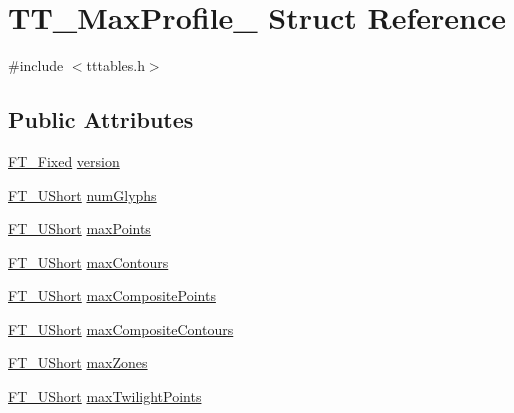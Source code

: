 \hypertarget{struct_t_t___max_profile__}{}\section{T\+T\+\_\+\+Max\+Profile\+\_\+ Struct Reference}
\label{struct_t_t___max_profile__}


{\ttfamily \#include $<$tttables.\+h$>$}

\subsection*{Public Attributes}
\begin{DoxyCompactItemize}
\item 
\mbox{\hyperlink{fttypes_8h_a5f5a679cc09f758efdd0d1c5feed3c3d}{F\+T\+\_\+\+Fixed}} \mbox{\hyperlink{struct_t_t___max_profile___a59618f7c572dadc58e883d32dea46380}{version}}
\item 
\mbox{\hyperlink{fttypes_8h_a937f6c17cf5ffd09086d8610c37b9f58}{F\+T\+\_\+\+U\+Short}} \mbox{\hyperlink{struct_t_t___max_profile___a6ec14b34978f24173d50ab556613ade5}{num\+Glyphs}}
\item 
\mbox{\hyperlink{fttypes_8h_a937f6c17cf5ffd09086d8610c37b9f58}{F\+T\+\_\+\+U\+Short}} \mbox{\hyperlink{struct_t_t___max_profile___a218fa149a195e9afa1738ef5aef07aa1}{max\+Points}}
\item 
\mbox{\hyperlink{fttypes_8h_a937f6c17cf5ffd09086d8610c37b9f58}{F\+T\+\_\+\+U\+Short}} \mbox{\hyperlink{struct_t_t___max_profile___a5af98bd8149008d0a33b61d9730262a9}{max\+Contours}}
\item 
\mbox{\hyperlink{fttypes_8h_a937f6c17cf5ffd09086d8610c37b9f58}{F\+T\+\_\+\+U\+Short}} \mbox{\hyperlink{struct_t_t___max_profile___aafc5ef3f58254792c353a6fb3b3a044e}{max\+Composite\+Points}}
\item 
\mbox{\hyperlink{fttypes_8h_a937f6c17cf5ffd09086d8610c37b9f58}{F\+T\+\_\+\+U\+Short}} \mbox{\hyperlink{struct_t_t___max_profile___a956e7c44e46a8aeb6d419b8550d1e556}{max\+Composite\+Contours}}
\item 
\mbox{\hyperlink{fttypes_8h_a937f6c17cf5ffd09086d8610c37b9f58}{F\+T\+\_\+\+U\+Short}} \mbox{\hyperlink{struct_t_t___max_profile___a07213312ec7b821a53a17d90930a478a}{max\+Zones}}
\item 
\mbox{\hyperlink{fttypes_8h_a937f6c17cf5ffd09086d8610c37b9f58}{F\+T\+\_\+\+U\+Short}} \mbox{\hyperlink{struct_t_t___max_profile___a907e28d69ad5e2a2c446e3eae8301af2}{max\+Twilight\+Points}}
\item 

\end{DoxyCompactItemize}
